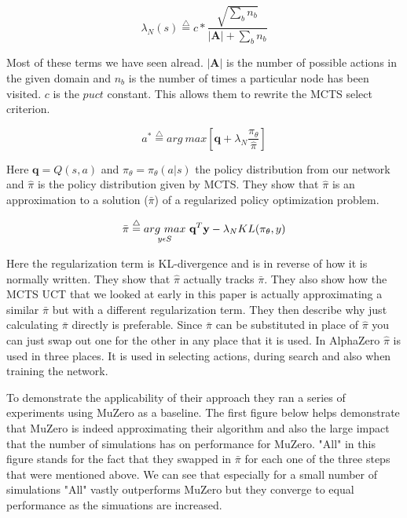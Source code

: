\begin{equation}
    \lambda_{N} (s) \overset{\triangle}{=} c * \frac{\sqrt{\sum_{b}n_{b}}}{|\mathbf{A}| + \sum_{b}n_{b}}
\end{equation}

Most of these terms we have seen alread. $| \mathbf{A} |$ is the number of possible actions in the given domain and $n_{b}$ is the number of times a particular node has been visited. $c$ is the $puct$ constant. This allows them to rewrite the MCTS select criterion. 

\begin{equation}
    a^{*} \overset{\triangle}{=} arg \ max [\textbf{q} + \lambda_{N} \frac{\pi_{\theta}}{\hat{\pi}}]
\end{equation}

Here $\textbf{q} = Q(s,a)$ and $ \pi_{\theta} = \pi_{\theta}(a | s)$ the policy distribution from our network and $\hat{\pi}$ is the policy distribution given by MCTS. They show that $\hat{\pi}$ is an approximation to a solution (${\bar{\pi}}$) of a regularized policy optimization problem.

\begin{equation}
    \bar{\pi} \overset{\triangle}{=} \underset{y \epsilon S}{arg \ max} \ \textbf{q}^{T}\textbf{y} - \lambda_{N}KL(\pi_{\theta},y)
\end{equation}

Here the regularization term is KL-divergence and is in reverse of how it is normally written. They show that $\hat{\pi}$ actually tracks $\bar{\pi}$. They also show how the MCTS UCT that we looked at early in this paper is actually approximating a similar $\bar{\pi}$ but with a different regularization term. They then describe why just calculating $\bar{\pi}$ directly is preferable. Since $\bar{\pi}$ can be substituted in place of $\hat{\pi}$ you can just swap out one for the other in any place that it is used. In AlphaZero $\hat{\pi}$ is used in three places. It is used in selecting actions, during search and also when training the network. 

To demonstrate the applicability of their approach they ran a series of experiments using MuZero as a baseline. The first figure below helps demonstrate that MuZero is indeed approximating their algorithm and also the large impact that the number of simulations has on performance for MuZero. "All" in this figure stands for the fact that they swapped in $\bar{\pi}$ for each one of the three steps that were mentioned above. We can see that especially for a small number of simulations "All" vastly outperforms MuZero but they converge to equal performance as the simuations are increased. 

